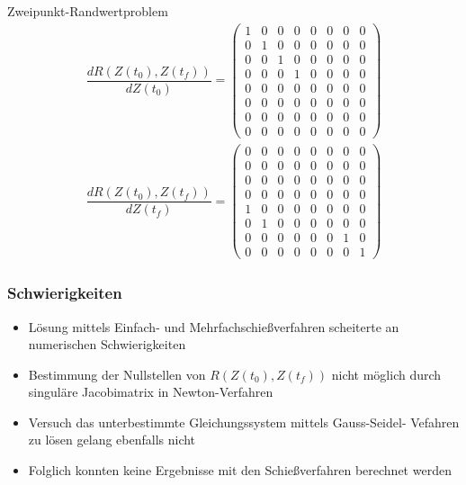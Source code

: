 \documentclass[aspectratio=169]{beamer}
\begin{document}
\begin{frame}
\begin{block}{Zweipunkt-Randwertproblem } 
  \scriptsize
\begin{align*}
\dfrac{d R(Z(t_0),Z(t_f))}{d Z(t_0)} = \begin{pmatrix}
1 & 0 & 0 & 0 & 0 & 0 & 0 & 0 \\ 
0 & 1 & 0 & 0 & 0 & 0 & 0 & 0 \\ 
0 & 0 & 1 & 0 & 0 & 0 & 0 & 0 \\ 
0 & 0 & 0 & 1 & 0 & 0 & 0 & 0 \\
0 & 0 & 0 & 0 & 0 & 0 & 0 & 0 \\
0 & 0 & 0 & 0 & 0 & 0 & 0 & 0 \\
0 & 0 & 0 & 0 & 0 & 0 & 0 & 0 \\
0 & 0 & 0 & 0 & 0 & 0 & 0 & 0
\end{pmatrix}
\end{align*}
\begin{align*}
\dfrac{d R(Z(t_0),Z(t_f))}{d Z(t_f)} = \begin{pmatrix}
0 & 0 & 0 & 0 & 0 & 0 & 0 & 0 \\ 
0 & 0 & 0 & 0 & 0 & 0 & 0 & 0 \\ 
0 & 0 & 0 & 0 & 0 & 0 & 0 & 0 \\ 
0 & 0 & 0 & 0 & 0 & 0 & 0 & 0 \\
1 & 0 & 0 & 0 & 0 & 0 & 0 & 0 \\
0 & 1 & 0 & 0 & 0 & 0 & 0 & 0 \\
0 & 0 & 0 & 0 & 0 & 0 & 1 & 0 \\
0 & 0 & 0 & 0 & 0 & 0 & 0 & 1
\end{pmatrix}
\end{align*}
   \end{block}
\end{frame}




\begin{frame}
  \frametitle{Schwierigkeiten}

  \begin{itemize}
    \item Lösung mittels Einfach- und Mehrfachschießverfahren scheiterte an numerischen Schwierigkeiten
    \item Bestimmung der Nullstellen von $R(Z(t_0),Z(t_f))$ nicht möglich durch singuläre Jacobimatrix in Newton-Verfahren
    \item Versuch das unterbestimmte Gleichungssystem mittels Gauss-Seidel- Vefahren zu lösen gelang ebenfalls nicht
    \item Folglich konnten keine Ergebnisse mit den Schießverfahren berechnet werden
  \end{itemize}
\end{frame}
\end{document}

